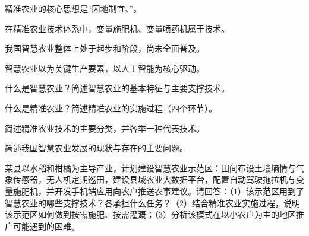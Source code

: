 \documentclass[a4paper,11pt]{article}
\begin{document}
\q 精准农业的核心思想是“因地制宜、\fillblanks[2.2cm]”。

\q 在精准农业技术体系中，变量施肥机、变量喷药机属于\fillblanks[2.0cm]技术。

\q 我国智慧农业整体上处于起步和\fillblanks[2.0cm]阶段，尚未全面普及。

\q 智慧农业以\fillblanks[1.6cm]为关键生产要素，以人工智能为核心驱动。

\newpage
{}
\q 什么是智慧农业？简述智慧农业的基本特征与主要支撑技术。\anslines{2.4cm}

\q 什么是精准农业？简述精准农业的实施过程（四个环节）。\anslines{2.4cm}

\q 简述精准农业技术的主要分类，并各举一种代表技术。\anslines{2.4cm}

\q 简述我国智慧农业发展的现状与存在的主要问题。\anslines{2.4cm}

\newpage
{}
\q 某县以水稻和柑橘为主导产业，计划建设智慧农业示范区：田间布设土壤墒情与气象传感器，无人机定期巡田，建设县域农业大数据平台，配置自动驾驶拖拉机与变量施肥机，并开发手机端应用向农户推送农事建议。请回答：（1）该示范区用到了智慧农业的哪些支撑技术？各承担什么任务？（2）结合精准农业实施过程，说明该示范区如何做到按需施肥、按需灌溉；（3）分析该模式在以小农户为主的地区推广可能遇到的困难。\anslines{6cm}
\end{document}
